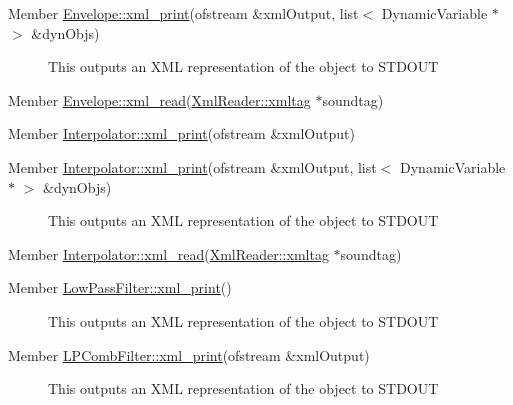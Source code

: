 \label{_deprecated000013}
\hypertarget{deprecated__deprecated000013}{}
 \begin{description}
\item[Member \hyperlink{classEnvelope_a29}{Envelope::xml\_\-print}(ofstream \&xml\-Output, list$<$ Dynamic\-Variable $\ast$ $>$ \&dyn\-Objs) ]This outputs an XML representation of the object to STDOUT \end{description}


\label{_deprecated000015}
\hypertarget{deprecated__deprecated000015}{}
 \begin{description}
\item[Member \hyperlink{classEnvelope_a31}{Envelope::xml\_\-read}(\hyperlink{classXmlReader_1_1xmltag}{Xml\-Reader::xmltag} $\ast$soundtag) ]\end{description}


\label{_deprecated000017}
\hypertarget{deprecated__deprecated000017}{}
 \begin{description}
\item[Member \hyperlink{classInterpolator_a8}{Interpolator::xml\_\-print}(ofstream \&xml\-Output) ]\end{description}


\label{_deprecated000016}
\hypertarget{deprecated__deprecated000016}{}
 \begin{description}
\item[Member \hyperlink{classInterpolator_a7}{Interpolator::xml\_\-print}(ofstream \&xml\-Output, list$<$ Dynamic\-Variable $\ast$ $>$ \&dyn\-Objs) ]This outputs an XML representation of the object to STDOUT \end{description}


\label{_deprecated000018}
\hypertarget{deprecated__deprecated000018}{}
 \begin{description}
\item[Member \hyperlink{classInterpolator_a9}{Interpolator::xml\_\-read}(\hyperlink{classXmlReader_1_1xmltag}{Xml\-Reader::xmltag} $\ast$soundtag) ]\end{description}


\label{_deprecated000019}
\hypertarget{deprecated__deprecated000019}{}
 \begin{description}
\item[Member \hyperlink{classLowPassFilter_a4}{Low\-Pass\-Filter::xml\_\-print}() ]This outputs an XML representation of the object to STDOUT \end{description}


\label{_deprecated000020}
\hypertarget{deprecated__deprecated000020}{}
 \begin{description}
\item[Member \hyperlink{classLPCombFilter_a4}{LPComb\-Filter::xml\_\-print}(ofstream \&xml\-Output) ]This outputs an XML representation of the object to STDOUT \end{description}


